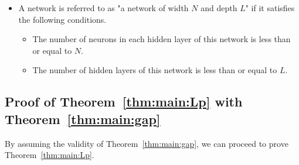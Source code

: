 \documentclass[nohyperref]{article}
\theoremstyle{plain}
\theoremstyle{definition}
\theoremstyle{remark}
\begin{document}
\begin{itemize}
	
	\item A network is referred to as "a network of width $N$ and depth $L$" if it satisfies the following conditions.
 	\begin{itemize}
		\item The number of neurons in each  {hidden} layer of this network is less than or equal to $N$.
		\item The number of {hidden} layers of this network  is less than or equal to $L$.
	\end{itemize} 
 
\end{itemize}

\subsection{Proof of Theorem~\ref{thm:main:Lp} with Theorem~\ref{thm:main:gap}}
\label{sec:proof:main:Lp}

 By assuming the validity of Theorem~\ref{thm:main:gap}, we can proceed to prove Theorem~\ref{thm:main:Lp}.
\end{document}
